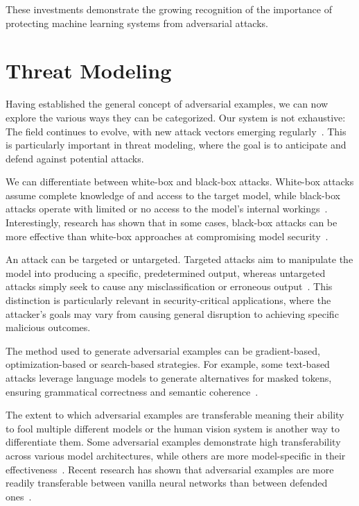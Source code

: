 \documentclass[a4paper, oneside]{discothesis}
\begin{document}
These investments demonstrate the growing recognition of the importance of protecting machine learning systems from adversarial attacks.

\section{Threat Modeling}

Having established the general concept of adversarial examples, we can now explore the various ways they can be categorized. Our system is not exhaustive: The field continues to evolve, with new attack vectors emerging regularly~\cite{Khaleel2024AdversarialAI}. This is particularly important in threat modeling, where the goal is to anticipate and defend against potential attacks.

We can differentiate between white-box and black-box attacks. White-box attacks assume complete knowledge of and access to the target model, while black-box attacks operate with limited or no access to the model's internal workings~\cite{capozzi2024adversarial}. Interestingly, research has shown that in some cases, black-box attacks can be more effective than white-box approaches at compromising model security~\cite{capozzi2024adversarial}.

An attack can be targeted or untargeted. Targeted attacks aim to manipulate the model into producing a specific, predetermined output, whereas untargeted attacks simply seek to cause any misclassification or erroneous output~\cite{capozzi2024adversarial, Kashyap2024AdversarialAA}. This distinction is particularly relevant in security-critical applications, where the attacker's goals may vary from causing general disruption to achieving specific malicious outcomes.

The method used to generate adversarial examples can be gradient-based, optimization-based or search-based strategies. For example, some text-based attacks leverage language models to generate alternatives for masked tokens, ensuring grammatical correctness and semantic coherence~\cite{garg2020bae}.

The extent to which adversarial examples are transferable \textendash{} meaning their ability to fool multiple different models or the human vision system\cite{elsayed2018adversarial} \textendash{} is another way to differentiate them. Some adversarial examples demonstrate high transferability across various model architectures, while others are more model-specific in their effectiveness~\cite{Li2022ASO, li2022review}. Recent research has shown that adversarial examples are more readily transferable between vanilla neural networks than between defended ones~\cite{li2019nattack, zheng2023black}.
\end{document}
